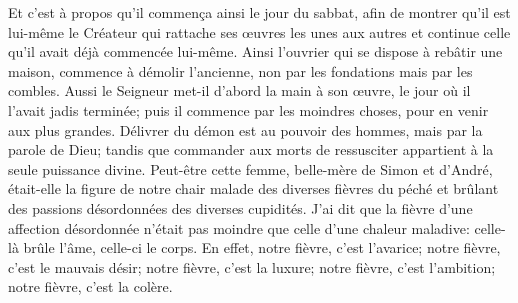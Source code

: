 Et c’est à propos qu’il commença ainsi le jour du sabbat,
	afin de montrer qu’il est lui-même le Créateur
	qui rattache ses œuvres les unes aux autres
	et continue celle qu’il avait déjà commencée lui-même.
Ainsi l’ouvrier qui se dispose à rebâtir une maison,
	commence à démolir l’ancienne, non par les fondations
	mais par les combles.
Aussi le Seigneur met-il d’abord la main à son œuvre,
	le jour où il l’avait jadis terminée;
	puis il commence par les moindres choses, pour en venir aux plus grandes.
Délivrer du démon est au pouvoir des hommes, mais par la parole de Dieu;
	tandis que commander aux morts de ressusciter
	appartient à la seule puissance divine.
Peut-être cette femme, belle-mère de Simon et d’André,
	était-elle la figure de notre chair malade des diverses fièvres du péché
	et brûlant des passions désordonnées des diverses cupidités.
J’ai dit que la fièvre d’une affection désordonnée
	n’était pas moindre que celle d’une chaleur maladive:
	celle-là brûle l’âme, celle-ci le corps.
En effet, notre fièvre, c’est l’avarice; notre fièvre, c’est le mauvais désir;
	notre fièvre, c’est la luxure; notre fièvre, c’est l’ambition;
		notre fièvre, c’est la colère.
